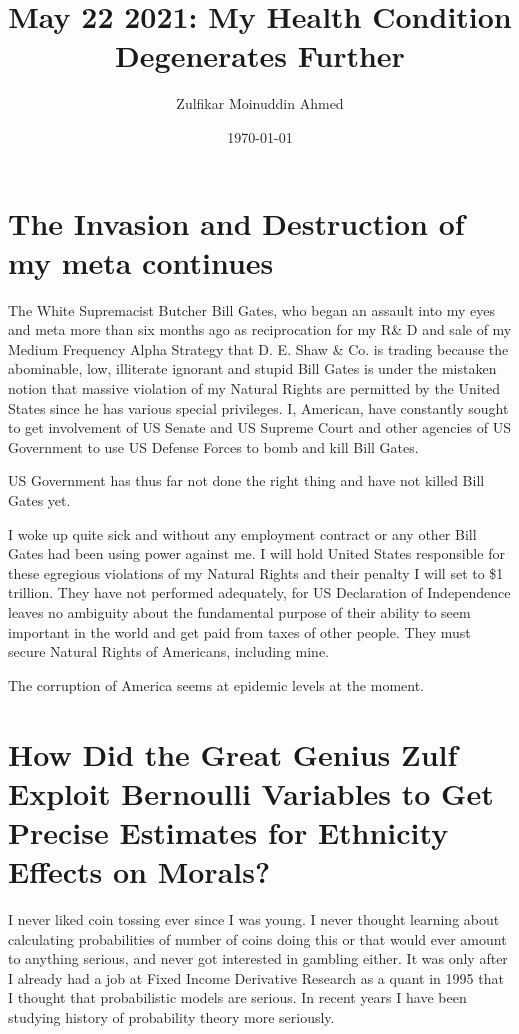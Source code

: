 \documentclass{amsart}
\title{May 22 2021:  My Health Condition Degenerates Further}
\author{Zulfikar Moinuddin Ahmed}
\date{\today}
\begin{document}
\maketitle

\section{The Invasion and Destruction of my meta continues}

The White Supremacist Butcher Bill Gates, who began an assault into my eyes and meta more than six months ago as reciprocation for my R\& D and sale of my Medium Frequency Alpha Strategy that D. E. Shaw \& Co. is trading because the abominable, low, illiterate ignorant and stupid Bill Gates is under the mistaken notion that massive violation of my Natural Rights are permitted by the United States since he has various special privileges.  I, American, have constantly sought to get involvement of US Senate and US Supreme Court and other agencies of US Government to use US Defense Forces to bomb and kill Bill Gates.  

US Government has thus far not done the right thing and have not killed Bill Gates yet.

I woke up quite sick and without any employment contract or any other Bill Gates had been using power against me.  I will hold United States responsible for these egregious violations of my Natural Rights and their penalty I will set to \$1 trillion.  They have not performed adequately, for US Declaration of Independence leaves no ambiguity about the fundamental purpose of their ability to seem important in the world and get paid from taxes of other people.  They must secure Natural Rights of Americans, including mine.  

The corruption of America seems at epidemic levels at the moment.

\section{How Did the Great Genius Zulf Exploit Bernoulli Variables to Get Precise Estimates for Ethnicity Effects on Morals?}

I never liked coin tossing ever since I was young.  I never thought learning about calculating probabilities of number of coins doing this or that would ever amount to anything serious, and never got interested in gambling either.  It was only after I already had a job at Fixed Income Derivative Research as a quant in 1995 that I thought that probabilistic models are serious.  In recent years I have been studying history of probability theory more seriously.  
\end{document}
